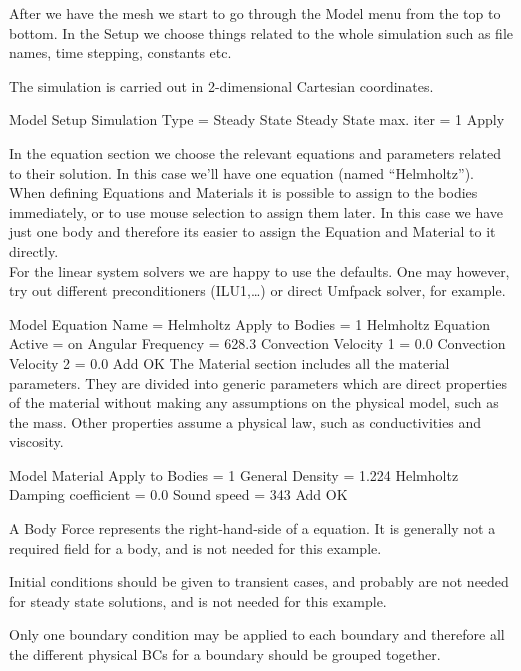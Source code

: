 After we have the mesh we start to go through the Model menu from the top to bottom.  In the Setup we choose things related to the whole simulation such as file names, time stepping, constants etc.  

The simulation is carried out in 2-dimensional Cartesian coordinates.

\ttbegin
Model
  Setup 
    Simulation Type = Steady State
    Steady State max. iter = 1
  Apply
\ttend

In the equation section we choose the relevant equations and parameters related to their solution.  In this case we'll have one equation (named ``Helmholtz'').\\

When defining Equations and Materials it is possible to assign to the bodies immediately, or to use mouse selection to assign them later. In this case we have just one body and therefore its easier to assign the Equation and Material to it directly.\\

For the linear system solvers we are happy to use the defaults. One may however, try out different preconditioners (ILU1,\ldots) or direct Umfpack solver, for example.

\ttbegin
Model
  Equation
   Name = Helmholtz
    Apply to Bodies = 1
    Helmholtz Equation
      Active = on
      Angular Frequency = 628.3
      Convection Velocity 1 = 0.0
      Convection Velocity 2 = 0.0
    Add 
    OK
\ttend        
The Material section includes all the material parameters. They are divided into generic parameters which are direct properties of the material without making any assumptions on the physical model, such as the mass. Other properties assume a physical law, such as conductivities and viscosity. 

\ttbegin
Model
  Material
    Apply to Bodies = 1 
    General 
      Density = 1.224
    Helmholtz
      Damping coefficient = 0.0
      Sound speed = 343
    Add
    OK
\ttend

A Body Force represents the right-hand-side of a equation. It is generally not a required field for a body, and is not needed for this example.

Initial conditions should be given to transient cases, and probably are not needed for steady state solutions, and is not needed for this example.

Only one boundary condition may be applied to each boundary and therefore all the different physical BCs for a boundary should be grouped together. 

